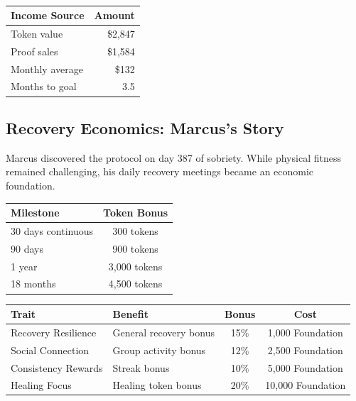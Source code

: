 \documentclass[11pt,letterpaper]{article}
\begin{document}
~


\begin{table}[H]
\centering
\begin{tabular}{lr}
\toprule
\textbf{Income Source} & \textbf{Amount} \\
\midrule
Token value & \$2,847 \\
Proof sales & \$1,584 \\
Monthly average & \$132 \\
\midrule
Months to goal & 3.5 \\
\bottomrule
\end{tabular}
\end{table}


\subsection{Recovery Economics: Marcus's Story}

Marcus discovered the protocol on day 387 of sobriety. While physical fitness remained challenging, his daily recovery meetings became an economic foundation.


\begin{table}[H]
\centering
\begin{tabular}{lc}
\toprule
\textbf{Milestone} & \textbf{Token Bonus} \\
\midrule
30 days continuous & 300 tokens \\
90 days & 900 tokens \\
1 year & 3,000 tokens \\
18 months & 4,500 tokens \\
\bottomrule
\end{tabular}
\end{table}


\begin{table}[H]
\centering
\begin{tabular}{llcc}
\toprule
\textbf{Trait} & \textbf{Benefit} & \textbf{Bonus} & \textbf{Cost} \\
\midrule
Recovery Resilience & General recovery bonus & 15\% & 1,000 Foundation \\
Social Connection & Group activity bonus & 12\% & 2,500 Foundation \\
Consistency Rewards & Streak bonus & 10\% & 5,000 Foundation \\
Healing Focus & Healing token bonus & 20\% & 10,000 Foundation \\
\bottomrule
\end{tabular}
\end{table}
\end{document}
